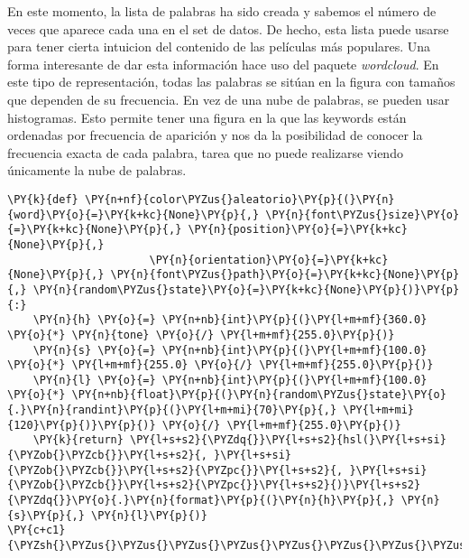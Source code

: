     En este momento, la lista de palabras ha sido creada y sabemos el número
de veces que aparece cada una en el set de datos. De hecho, esta lista
puede usarse para tener cierta intuicion del contenido de las películas
más populares. Una forma interesante de dar esta información hace uso
del paquete \emph{wordcloud}. En este tipo de representación, todas las
palabras se sitúan en la figura con tamaños que dependen de su
frecuencia. En vez de una nube de palabras, se pueden usar histogramas.
Esto permite tener una figura en la que las keywords están ordenadas por
frecuencia de aparición y nos da la posibilidad de conocer la frecuencia
exacta de cada palabra, tarea que no puede realizarse viendo únicamente
la nube de palabras.

    \begin{tcolorbox}[breakable, size=fbox, boxrule=1pt, pad at break*=1mm,colback=cellbackground, colframe=cellborder]
\begin{Verbatim}[commandchars=\\\{\}]
\PY{k}{def} \PY{n+nf}{color\PYZus{}aleatorio}\PY{p}{(}\PY{n}{word}\PY{o}{=}\PY{k+kc}{None}\PY{p}{,} \PY{n}{font\PYZus{}size}\PY{o}{=}\PY{k+kc}{None}\PY{p}{,} \PY{n}{position}\PY{o}{=}\PY{k+kc}{None}\PY{p}{,}
                      \PY{n}{orientation}\PY{o}{=}\PY{k+kc}{None}\PY{p}{,} \PY{n}{font\PYZus{}path}\PY{o}{=}\PY{k+kc}{None}\PY{p}{,} \PY{n}{random\PYZus{}state}\PY{o}{=}\PY{k+kc}{None}\PY{p}{)}\PY{p}{:}
    \PY{n}{h} \PY{o}{=} \PY{n+nb}{int}\PY{p}{(}\PY{l+m+mf}{360.0} \PY{o}{*} \PY{n}{tone} \PY{o}{/} \PY{l+m+mf}{255.0}\PY{p}{)}
    \PY{n}{s} \PY{o}{=} \PY{n+nb}{int}\PY{p}{(}\PY{l+m+mf}{100.0} \PY{o}{*} \PY{l+m+mf}{255.0} \PY{o}{/} \PY{l+m+mf}{255.0}\PY{p}{)}
    \PY{n}{l} \PY{o}{=} \PY{n+nb}{int}\PY{p}{(}\PY{l+m+mf}{100.0} \PY{o}{*} \PY{n+nb}{float}\PY{p}{(}\PY{n}{random\PYZus{}state}\PY{o}{.}\PY{n}{randint}\PY{p}{(}\PY{l+m+mi}{70}\PY{p}{,} \PY{l+m+mi}{120}\PY{p}{)}\PY{p}{)} \PY{o}{/} \PY{l+m+mf}{255.0}\PY{p}{)}
    \PY{k}{return} \PY{l+s+s2}{\PYZdq{}}\PY{l+s+s2}{hsl(}\PY{l+s+si}{\PYZob{}\PYZcb{}}\PY{l+s+s2}{, }\PY{l+s+si}{\PYZob{}\PYZcb{}}\PY{l+s+s2}{\PYZpc{}}\PY{l+s+s2}{, }\PY{l+s+si}{\PYZob{}\PYZcb{}}\PY{l+s+s2}{\PYZpc{}}\PY{l+s+s2}{)}\PY{l+s+s2}{\PYZdq{}}\PY{o}{.}\PY{n}{format}\PY{p}{(}\PY{n}{h}\PY{p}{,} \PY{n}{s}\PY{p}{,} \PY{n}{l}\PY{p}{)}
\PY{c+c1}{\PYZsh{}\PYZus{}\PYZus{}\PYZus{}\PYZus{}\PYZus{}\PYZus{}\PYZus{}\PYZus{}\PYZus{}\PYZus{}\PYZus{}\PYZus{}\PYZus{}\PYZus{}\PYZus{}\PYZus{}\PYZus{}\PYZus{}\PYZus{}\PYZus{}\PYZus{}\PYZus{}\PYZus{}\PYZus{}\PYZus{}\PYZus{}\PYZus{}\PYZus{}\PYZus{}\PYZus{}\PYZus{}\PYZus{}\PYZus{}\PYZus{}\PYZus{}\PYZus{}\PYZus{}\PYZus{}\PYZus{}\PYZus{}\PYZus{}\PYZus{}\PYZus{}\PYZus{}\PYZus{}}

\end{Verbatim}
\end{tcolorbox}
